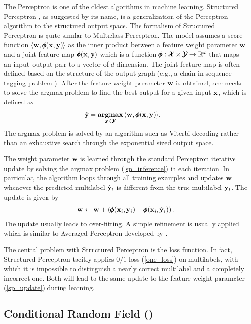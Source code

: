 {The Perceptron \citep{Rosenblatt58} is one of the oldest algorithms in machine learning.
Structured Perceptron \citep{collins02a, collins02b}, as suggested by its name, is a generalization of the Perceptron algorithm to the structured output space.
The formalism of Structured Perceptron is quite similar to Multiclass Perceptron. 
The model assumes a score function $\langle \mathbf {w}, \pmb \phi(\mathbf {x},\mathbf {y}) \rangle$ as the inner product between a feature weight parameter $\mathbf {w}$ and a joint feature map $\pmb \phi(\mathbf {x},\mathbf {y})$ which is a function $\pmb \phi:\pmb {\mathcal{X}}\times\pmb {\mathcal{Y}}\rightarrow\mathbb{R}^d$ that maps an input--output pair to a vector of $d$ dimension.
The joint feature map is often defined based on the structure of the output graph (e.g., a chain in sequence tagging problem \citep{collins02a}).
After the feature weight parameter $\mathbf {w}$ is obtained, one needs to solve the {argmax} problem to find the best output for a given input $\mathbf {x}$, which is defined as
\begin{align}
	\hat{\mathbf {y}} = \underset{\mathbf {y}\in\pmb {\mathcal{Y}}}{\textbf{argmax}} &\, \langle \mathbf {w}, \pmb \phi(\mathbf {x},\mathbf {y}) \rangle. \label{sp_inference}
\end{align}
The argmax problem is solved by an algorithm such as Viterbi decoding \citep{collins02a} rather than an exhaustive search through the exponential sized output space.

The weight parameter $\mathbf {w}$ is learned through the standard Perceptron iterative update by solving the argmax problem (\ref{sp_inference}) in each iteration.
In particular, the algorithm loops through all training examples and updates $\mathbf {w}$ whenever the predicted multilabel $\hat{\mathbf {y}}_i$ is different from the true multilabel $\mathbf {y}_i$.
The update is given by
\begin{align}
	\mathbf {w} \leftarrow \mathbf {w} + \left(\pmb \phi(\mathbf {x}_i,\mathbf {y}_i) - \pmb \phi(\mathbf {x}_i,\hat{\mathbf {y}}_i)\right). \label{sp_update}
\end{align}
The update usually leads to over-fitting.
A simple refinement is usually applied which is similar to Averaged Perceptron developed by \citet{Freund99large}.

The central problem with Structured Perceptron is the loss function.
In fact, Structured Perceptron tacitly applies $0/1$ loss (\ref{one_loss}) on multilabels, with which it is impossible to distinguish a nearly correct multilabel and a completely incorrect one.
Both will lead to the same update to the feature weight parameter (\ref{sp_update}) during learning.


%
% 
\subsection{Conditional Random Field (\crf)} \label{sc_crf}

}
